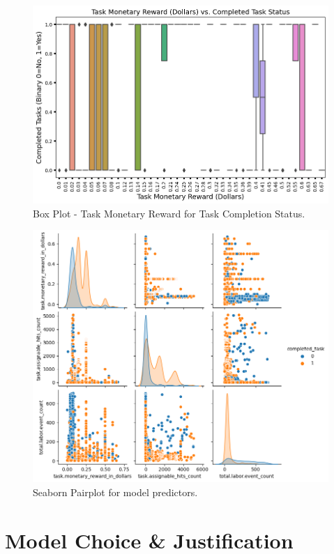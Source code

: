 \documentclass[11pt]{article}
\begin{document}
\begin{figure}[hbt!]
  \centering
  \includegraphics[width=450pt]{figures/task-monetary_reward_in_dollars-vs-completed_task-boxplot}
  \caption{Box Plot - Task Monetary Reward for Task Completion Status.}
\end{figure}

\begin{figure}[hbt!]
  \centering
  \includegraphics[width=\linewidth]{figures/sns-pairplot}
  \caption{Seaborn Pairplot for model predictors.}
\end{figure}


\section{Model Choice \& Justification}
\end{document}
